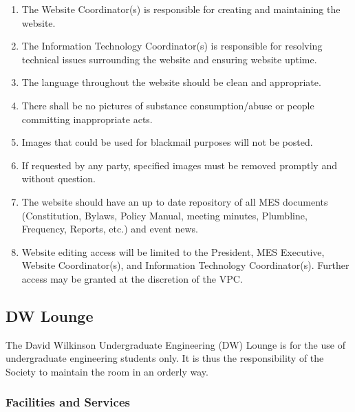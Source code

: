 \begin{enumerate}
 \item
  The Website Coordinator(s) is responsible for creating and maintaining the website.
 \item
  The Information Technology Coordinator(s) is responsible for resolving technical issues surrounding the website and ensuring website uptime.
 \item
  The language throughout the website should be clean and appropriate.
 \item
  There shall be no pictures of substance consumption/abuse or people committing inappropriate acts.
 \item
  Images that could be used for blackmail purposes will not be posted.
 \item
  If requested by any party, specified images must be removed promptly and without question.
 \item
  The website should have an up to date repository of all MES documents (Constitution, Bylaws, Policy Manual, meeting minutes, Plumbline, Frequency, Reports, etc.) and event news.
 \item
  Website editing access will be limited to the President, MES Executive, Website Coordinator(s), and Information Technology Coordinator(s). Further access may be granted at the discretion of the VPC.

\end{enumerate}

\subsection{DW Lounge}
\label{dw-lounge}
The David Wilkinson Undergraduate Engineering (DW) Lounge is for the use
of undergraduate engineering students only. It is thus the
responsibility of the Society to maintain the room in an orderly way.

\subsubsection{Facilities and Services}
\label{facilities-and-services}

